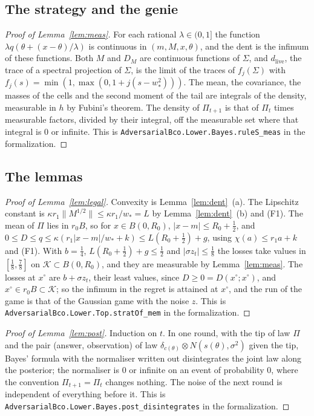 \documentclass[11pt]{amsart}
\theoremstyle{definition}
\numberwithin{equation}{section}
\newcommand{\cK}{\mathcal{K}}
\begin{document}
\subsection*{The strategy and the genie}

\begin{proof}[Proof of Lemma~\ref{lem:meas}]
For each rational $\lambda\in(0,1]$ the function $\lambda q(\theta+(x-\theta)/\lambda)$ is continuous in $(m,M,x,\theta)$, and the dent is the infimum of these functions. Both $M$ and $D_M$ are continuous functions of $\Sigma$, and $d_{\mathrm{live}}$, the trace of a spectral projection of $\Sigma$, is the limit of the traces of $f_j(\Sigma)$ with $f_j(s)=\min(1,\max(0,1+j(s-w_*^2)))$. The mean, the covariance, the masses of the cells and the second moment of the tail are integrals of the density, measurable in $h$ by Fubini's theorem. The density of $\Pi_{t+1}$ is that of $\Pi_t$ times measurable factors, divided by their integral, off the measurable set where that integral is $0$ or infinite.
This is \texttt{AdversarialBco.Lower.Bayes.ruleS\_meas} in the formalization.
\end{proof}

\subsection*{The lemmas}

\begin{proof}[Proof of Lemma~\ref{lem:legal}]
Convexity is Lemma~\ref{lem:dent}~(a). The Lipschitz constant is $\kappa r_1\|M^{1/2}\|\le\kappa r_1/w_*=L$ by Lemma~\ref{lem:dent}~(b) and (F1). The mean of $\Pi$ lies in $r_0B$, so for $x\in B(0,R_0)$, $|x-m|\le R_0+\frac12$, and $0\le D\le q\le\kappa(r_1|x-m|/w_*+k)\le L(R_0+\frac12)+g$, using $\chi(a)\le r_1a+k$ and (F1). With $b=\frac14$, $L(R_0+\frac12)+g\le\frac12$ and $|\sigma z_t|\le\frac18$ the losses take values in $[\frac18,\frac78]$ on $\cK\subset B(0,R_0)$, and they are measurable by Lemma~\ref{lem:meas}. The losses at $x^\circ$ are $b+\sigma z_t$, their least values, since $D\ge0=D(x^\circ;x^\circ)$, and $x^\circ\in r_0B\subset\cK$; so the infimum in the regret is attained at $x^\circ$, and the run of the game is that of the Gaussian game with the noise $z$.
This is \texttt{AdversarialBco.Lower.Top.stratOf\_mem} in the formalization.
\end{proof}

\begin{proof}[Proof of Lemma~\ref{lem:post}]
Induction on $t$. In one round, with the tip of law $\Pi$ and the pair (answer, observation) of law $\delta_{c(\theta)}\otimes N(s(\theta),\sigma^2)$ given the tip, Bayes' formula with the normaliser written out disintegrates the joint law along the posterior; the normaliser is $0$ or infinite on an event of probability $0$, where the convention $\Pi_{t+1}=\Pi_t$ changes nothing. The noise of the next round is independent of everything before it.
This is \texttt{AdversarialBco.Lower.Bayes.post\_disintegrates} in the formalization.
\end{proof}
\end{document}
